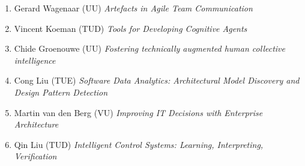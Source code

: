 \begin{multicols}{2}
\begin{scriptsize}
\begin{enumerate}[leftmargin=*,noitemsep,topsep=0pt,parsep=1pt,partopsep=0pt]
\item Gerard Wagenaar (UU) \textit{Artefacts in Agile Team Communication}
\item Vincent Koeman (TUD) \textit{Tools for Developing Cognitive Agents}
\item Chide Groenouwe (UU) \textit{Fostering technically augmented human collective intelligence}
\item Cong Liu (TUE) \textit{Software Data Analytics: Architectural Model Discovery and Design Pattern Detection}
\item Martin van den Berg (VU) \textit{Improving IT Decisions with Enterprise Architecture}
\item Qin Liu (TUD) \textit{Intelligent Control Systems: Learning, Interpreting, Verification}

\end{enumerate}



\end{scriptsize}
\end{multicols}
\restoregeometry